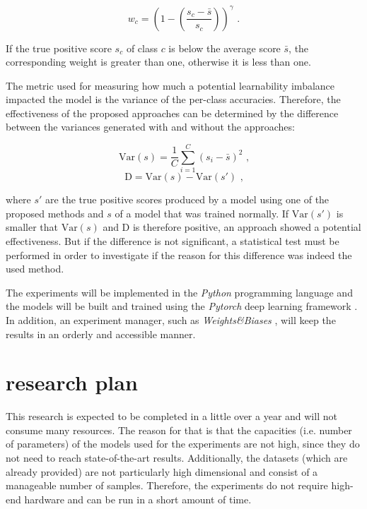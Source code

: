 \documentclass[journal]{IEEEtran}
\begin{document}
\[ w_c = \left(1-\left(\frac{s_c - \bar{s}}{s_c}\right)\right)^\gamma \text{ .} \]

If the true positive score $s_c$ of class $c$ is below the average score $\bar{s}$, the corresponding weight is greater than one, otherwise it is less than one.

The metric used for measuring how much a potential learnability imbalance impacted the model is the variance of the per-class accuracies.
Therefore, the effectiveness of the proposed approaches can be determined by the difference between the variances generated with and without the approaches:

\[ \text{Var}(s) = \frac{1}{C} \sum_{i=1}^{C} (s_i - \bar{s})^2 \text{ ,} \]
\[ \text{D} = \text{Var}(s) - \text{Var}(s') \text{ ,} \]

where $s'$ are the true positive scores produced by a model using one of the proposed methods and $s$ of a model that was trained normally. 
If $\text{Var}(s')$ is smaller that $\text{Var}(s)$ and D is therefore positive, an approach showed a potential effectiveness.
But if the difference is not significant, a statistical test must be performed in order to investigate if the reason for this difference was indeed the used method.

The experiments will be implemented in the \emph{Python} programming language and the models will be built and trained using the \emph{Pytorch} deep learning framework \cite{paszke2019pytorch}.
In addition, an experiment manager, such as \emph{Weights\&Biases} \cite{WandB}, will keep the results in an orderly and accessible manner.

\section{research plan}
This research is expected to be completed in a little over a year and will not consume many resources.
The reason for that is that the capacities (i.e. number of parameters) of the models used for the experiments are not high, since they do not need to reach state-of-the-art results.
Additionally, the datasets (which are already provided) are not particularly high dimensional and consist of a manageable number of samples.
Therefore, the experiments do not require high-end hardware and can be run in a short amount of time.
\end{document}
